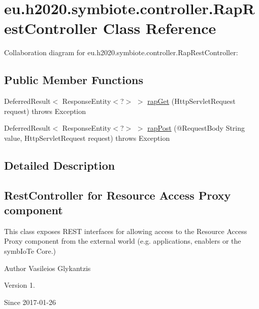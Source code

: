 \hypertarget{classeu_1_1h2020_1_1symbiote_1_1controller_1_1RapRestController}{}\section{eu.\+h2020.\+symbiote.\+controller.\+Rap\+Rest\+Controller Class Reference}
\label{classeu_1_1h2020_1_1symbiote_1_1controller_1_1RapRestController}


Collaboration diagram for eu.\+h2020.\+symbiote.\+controller.\+Rap\+Rest\+Controller\+:
\subsection*{Public Member Functions}
\begin{DoxyCompactItemize}
\item 
Deferred\+Result$<$ Response\+Entity$<$?$>$ $>$ \hyperlink{classeu_1_1h2020_1_1symbiote_1_1controller_1_1RapRestController_a505d4e7b0a63caeb4343679149422b26}{rap\+Get} (Http\+Servlet\+Request request)  throws Exception 
\item 
Deferred\+Result$<$ Response\+Entity$<$?$>$ $>$ \hyperlink{classeu_1_1h2020_1_1symbiote_1_1controller_1_1RapRestController_a6c012c973b8b6500acc7c638a53b45a1}{rap\+Post} (@Request\+Body String value, Http\+Servlet\+Request request)  throws Exception 
\end{DoxyCompactItemize}


\subsection{Detailed Description}
\subsection*{Rest\+Controller for Resource Access Proxy component}

This class exposes R\+E\+ST interfaces for allowing access to the Resource Access Proxy component from the external world (e.\+g. applications, enablers or the symb\+Io\+Te Core.)

\begin{DoxyAuthor}{Author}
Vasileios Glykantzis 
\end{DoxyAuthor}
\begin{DoxyVersion}{Version}
1. 
\end{DoxyVersion}
\begin{DoxySince}{Since}
2017-\/01-\/26 
\end{DoxySince}


